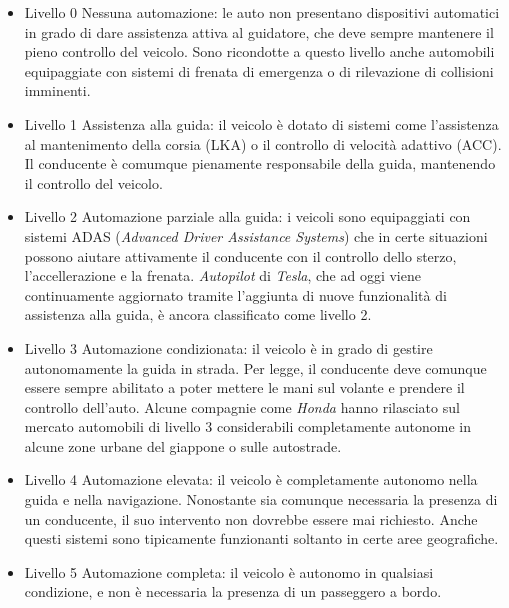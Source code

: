 \documentclass[letterpaper, 12pt]{article}
\begin{document}
\begin{itemize}
\item Livello 0 \newline
Nessuna automazione: le auto non presentano dispositivi automatici in grado di dare
assistenza attiva al guidatore, che deve sempre mantenere il pieno controllo del veicolo.
Sono ricondotte a questo livello anche automobili equipaggiate con sistemi di frenata di 
emergenza o di rilevazione di collisioni imminenti.
\item Livello 1 \newline
Assistenza alla guida: il veicolo è dotato di sistemi come l'assistenza al mantenimento della
corsia (LKA) o il controllo di velocità adattivo (ACC). Il conducente è comumque pienamente
responsabile della guida, mantenendo il controllo del veicolo.
\item Livello 2 \newline
Automazione parziale alla guida: i veicoli sono equipaggiati con sistemi ADAS (\emph{Advanced Driver Assistance Systems})
che in certe situazioni possono aiutare attivamente il conducente con il controllo dello sterzo, l'accellerazione
e la frenata. \emph{Autopilot} di \emph{Tesla}, che ad oggi viene continuamente aggiornato tramite
l'aggiunta di nuove funzionalità di assistenza alla guida, è ancora classificato come livello 2.
\item Livello 3 \newline
Automazione condizionata: il veicolo è in grado di gestire autonomamente la guida in
strada. Per legge, il conducente deve comunque essere sempre abilitato a poter mettere
le mani sul volante e prendere il controllo dell'auto. Alcune compagnie
come \emph{Honda} hanno rilasciato sul mercato automobili di livello 3 considerabili
completamente autonome in alcune zone urbane del giappone o sulle autostrade.
\item Livello 4 \newline
Automazione elevata: il veicolo è completamente autonomo nella guida e nella navigazione.
Nonostante sia comunque necessaria la presenza di un conducente, il suo intervento
non dovrebbe essere mai richiesto. Anche questi sistemi sono tipicamente funzionanti
soltanto in certe aree geografiche.
\item Livello 5 \newline
Automazione completa: il veicolo è autonomo in qualsiasi condizione, e non è necessaria
la presenza di un passeggero a bordo.
\end{itemize}
\end{document}
